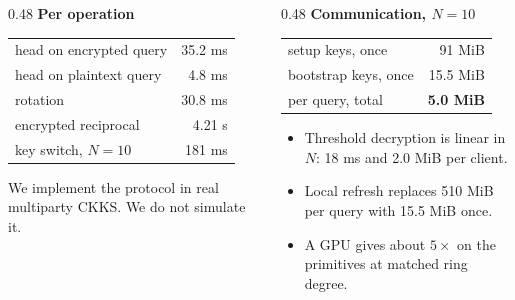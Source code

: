 \documentclass[aspectratio=169,11pt]{beamer}
\begin{document}
\begin{frame}
  \begin{columns}[T]
    \begin{column}{0.48\textwidth}
      \textbf{Per operation}
      \begin{center}\footnotesize
      \begin{tabular}{lr}
        \toprule
        head on encrypted query & 35.2 ms\\
        head on plaintext query & 4.8 ms\\
        rotation                & 30.8 ms\\
        encrypted reciprocal    & 4.21 s\\
        key switch, $N=10$      & 181 ms\\
        \bottomrule
      \end{tabular}
      \end{center}
      \vspace{0.4em}
      \small We implement the protocol in real multiparty CKKS. We do not simulate it.
    \end{column}
    \begin{column}{0.48\textwidth}
      \textbf{Communication, $N=10$}
      \begin{center}\footnotesize
      \begin{tabular}{lr}
        \toprule
        setup keys, once  & 91 MiB\\
        bootstrap keys, once & 15.5 MiB\\
        per query, total  & \textbf{5.0 MiB}\\
        \bottomrule
      \end{tabular}
      \end{center}
      \vspace{0.4em}
      \begin{itemize}\small
        \item Threshold decryption is linear in $N$: 18 ms and 2.0 MiB per client.
        \item Local refresh replaces 510 MiB per query with 15.5 MiB once.
        \item A GPU gives about $5\times$ on the primitives at matched ring degree.
      \end{itemize}
    \end{column}
  \end{columns}
\end{frame}
\end{document}
